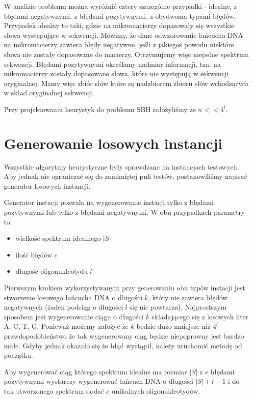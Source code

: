 \documentclass[a4paper,10pt]{article}
\begin{document}
W analizie problemu można wyróżnić cztery szczególne przypadki - idealny, z błędami negatywnymi, z błędami pozytywnymi, z obydwoma typami błędów.
Przypadek idealny to taki, gdzie na mikromacierzy dopasowały się wszystkie słowa występujące w sekwencji.
Mówimy, że dane odwzorowanie łańcucha DNA na mikromacierzy zawiera błędy negatywne, jeśli z jakiegoś powodu niektóre słowa nie
zostały dopasowane do macierzy. Otrzymujemy więc niepełne spektrum sekwencji.
Błędami pozytywnymi określamy nadmiar informacji, tzn. na mikromacierzy zostały dopasowane słowa, które nie występują w sekwencji
oryginalnej. Mamy więc zbiór słów które są nadzbiorem zbioru słów wchodzących w skład oryginalnej sekwencji.

Przy projektowaniu heurystyk do problemu SBH założyliśmy że $n << 4^l$.

\section{Generowanie losowych instancji}
Wszystkie algorytmy heurystyczne były sprawdzane na instancjach testowych. 
Aby jednak nie ograniczać się do zamkniętej puli testów, postanowiliśmy 
napisać generator losowych instancji. 

Generator instacji pozwala na wygenerowanie instacji tylko z błędami pozytywnymi
lub tylko z błędami negatywnymi. W obu przypadkach parametry to:
\begin{itemize}
 \item wielkość spektrum idealnego $|S|$
 \item ilość błędów $e$
 \item długość oligonukleotydu $l$
\end{itemize}

Pierwszym krokiem wykorzystywanym przy generowaniu obu typów instacji jest stworzenie
losowego łańcucha DNA o długości $k$, który nie zawiera błędów negatywnych (żaden 
podciąg o długości $l$ się nie powtarza). Najprostszym sposobem jest wygenerowanie 
ciągu o długości $k$ składającego się z losowych liter A, C, T, G. Ponieważ możemy 
założyć że $k$ będzie dużo mniejsze niż $4^l$ prawdopodobieństwo że tak wygenerowany
ciąg będzie niepoprawny jest bardzo małe. Gdyby jednak okazało się że błąd wystąpił,
należy uruchomić metodę od początku.

Aby wygenerować ciąg którego spektrum idealne ma rozmiar $|S|$ z $e$ błędami pozytywnymi
wystarczy wygenerować łańcuch DNA o długości $|S|+l-1$ i do tak utworzonego spektrum 
dodać $e$ unikalnych oligonukleotydów.
\end{document}
